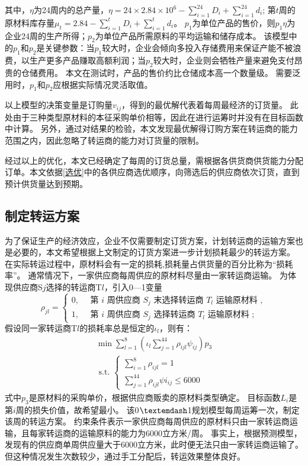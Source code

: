 \noindent 其中，$\eta$为24周内的总产量，$\eta=24 \times 2.84\times10^6-\sum_{i=1}^{24}D_i+\sum_{i=1}^{24}d_i$;
第$t$周的原材料库存量$\mu_t=2.84-\sum_{i=1}^{t}D_i+\sum_{i=1}^{t}d_i$。
$p_1$为单位产品的售价，则$p_1\eta$为企业24周的生产所得；$p_2$为单位产品所需原料的平均运输和储存成本。
该模型中的$p_1$和$p_2$是关键参数：当$p_1$较大时，企业会倾向多投入存储费用来保证产能不被浪费，以生产更多产品赚取高额利润；当$p_2$较大时，企业则会牺牲产量来避免支付昂贵的仓储费用。
本文在测试时，产品的售价约比仓储成本高一个数量级。
需要泛用时，$p_1$和$p_2$应根据实际情况灵活取值。

以上模型的决策变量是订购量$v_{ij}$，得到的最优解代表着每周最经济的订货量。
此处由于三种类型原材料的本征采购单价相等，因此在进行运筹时并没有在目标函数中计算。
另外，通过对结果的检验，本文发现最优解得订购方案在转运商的能力范围之内，因此忽略了转运商的能力对订货量的限制。

经过以上的优化，本文已经确定了每周的订货总量，需根据各供货商供货能力分配订单。本文依据\ref{选优}中的各供应商选优顺序，向筛选后的供应商依次订货，直到预计供货量达到预期。

\subsection{制定转运方案}

为了保证生产的经济效应，企业不仅需要制定订货方案，计划转运商的运输方案也是必要的，本文希望根据上文制定的订货方案进一步计划损耗最少的转运方案。
在实际转运过程中，原材料会有一定的损耗,损耗量占供货量的百分比称为“损耗率”。
通常情况下，一家供应商每周供应的原材料尽量由一家转运商运输。
为体现供应商S$j$选择的转运商T$l$，引入0—1变量
\begin{equation}
\rho_{j l}=\left\{\begin{array}{l}
0,\quad  \text { 第 } i \text { 周供应商 } S_j \text { 末选择转运商 } T_l \text { 运输原材料 }, \\
1,\quad  \text { 第 } i \text { 周供应商 } S_j \text { 选择转运商 } T_l \text { 运输原材料 };
\end{array}\right.
\end{equation}
假设同一家转运商T$l$的损耗率总是恒定的$\iota_l$，则有：
\begin{equation}
\begin{array}{l}
\min \sum_{l=1}^{8}\left(\iota_{l} \sum_{j=1}^{44} \rho_{i j l} \psi_{i j}\right) p_3\\
\text { s.t. }\left\{\begin{array}{l}
\sum_{i=1}^{8} \rho_{i j l}=1 \\
\sum_{j=1}^{44} \rho_{i j l} \psi i_{i j} \leq 6000
\end{array}\right.
\end{array}
\end{equation}
式中$p_3$是原材料的采购单价，根据供应商贩卖的原材料类型确定。
目标函数$L_i$是第$i$周的损失价值，故希望最小。
该0$\textemdash$1规划模型每周运筹一次，制定该周的转运方案。
约束条件表示一家供应商每周供应的原材料只由一家转运商运输，且每家转运商的运输原料的能力为6000立方米/周。
事实上，根据预测模型，发现有的供应商单周供应量大于6000立方米，此时便无法只由一家转运商运输了。
但这种情况发生次数较少，通过手工分配后，转运效果整体良好。

